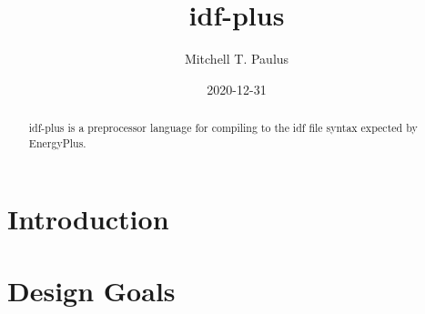 \documentclass{article}
\author{Mitchell T. Paulus}
\title{idf-plus}
\date{2020-12-31}
\begin{document}
\maketitle

\begin{abstract}
    idf-plus is a preprocessor language for compiling to the idf file
    syntax expected by EnergyPlus.
\end{abstract}

\section{Introduction}



\section{Design Goals}


\end{document}
